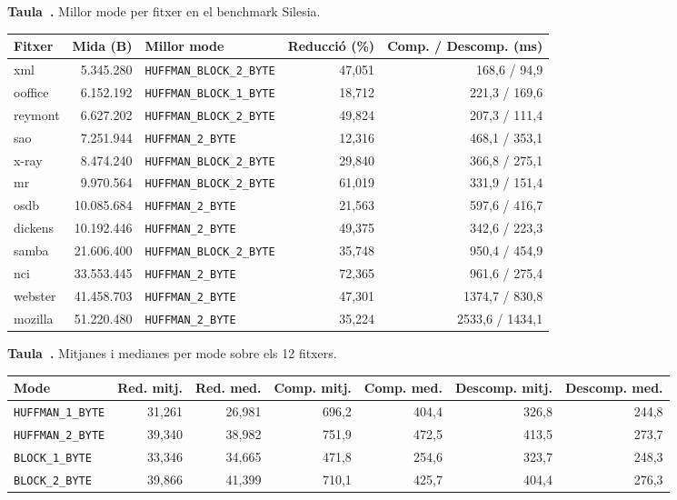 \documentclass[conference,compsoc]{IEEEtran}
\begin{document}
\begin{figure}[p]
\centering
\footnotesize

\label{tab:bestmode}
\textbf{Taula~\thetable.} Millor mode per fitxer en el benchmark Silesia.\par\smallskip
\scriptsize
\begin{tabular}{@{}lrlrr@{}}
\toprule
\textbf{Fitxer} & \textbf{Mida (B)} & \textbf{Millor mode} & \textbf{Reducció (\%)} & \textbf{Comp. / Descomp. (ms)} \\
\midrule
xml & 5.345.280 & \texttt{HUFFMAN\_BLOCK\_2\_BYTE} & 47,051 & 168,6 / 94,9 \\
ooffice & 6.152.192 & \texttt{HUFFMAN\_BLOCK\_1\_BYTE} & 18,712 & 221,3 / 169,6 \\
reymont & 6.627.202 & \texttt{HUFFMAN\_BLOCK\_2\_BYTE} & 49,824 & 207,3 / 111,4 \\
sao & 7.251.944 & \texttt{HUFFMAN\_2\_BYTE} & 12,316 & 468,1 / 353,1 \\
x-ray & 8.474.240 & \texttt{HUFFMAN\_BLOCK\_2\_BYTE} & 29,840 & 366,8 / 275,1 \\
mr & 9.970.564 & \texttt{HUFFMAN\_BLOCK\_2\_BYTE} & 61,019 & 331,9 / 151,4 \\
osdb & 10.085.684 & \texttt{HUFFMAN\_2\_BYTE} & 21,563 & 597,6 / 416,7 \\
dickens & 10.192.446 & \texttt{HUFFMAN\_2\_BYTE} & 49,375 & 342,6 / 223,3 \\
samba & 21.606.400 & \texttt{HUFFMAN\_BLOCK\_2\_BYTE} & 35,748 & 950,4 / 454,9 \\
nci & 33.553.445 & \texttt{HUFFMAN\_2\_BYTE} & 72,365 & 961,6 / 275,4 \\
webster & 41.458.703 & \texttt{HUFFMAN\_2\_BYTE} & 47,301 & 1374,7 / 830,8 \\
mozilla & 51.220.480 & \texttt{HUFFMAN\_2\_BYTE} & 35,224 & 2533,6 / 1434,1 \\
\bottomrule
\end{tabular}
\par\medskip

\label{tab:modeavg}
\textbf{Taula~\thetable.} Mitjanes i medianes per mode sobre els 12 fitxers.\par\smallskip
\scriptsize
\begin{tabular}{@{}lrrrrrr@{}}
\toprule
\textbf{Mode} & \textbf{Red. mitj.} & \textbf{Red. med.} & \textbf{Comp. mitj.} & \textbf{Comp. med.} & \textbf{Descomp. mitj.} & \textbf{Descomp. med.} \\
\midrule
\texttt{HUFFMAN\_1\_BYTE} & 31,261 & 26,981 & 696,2 & 404,4 & 326,8 & 244,8 \\
\texttt{HUFFMAN\_2\_BYTE} & 39,340 & 38,982 & 751,9 & 472,5 & 413,5 & 273,7 \\
\texttt{BLOCK\_1\_BYTE} & 33,346 & 34,665 & 471,8 & 254,6 & 323,7 & 248,3 \\
\texttt{BLOCK\_2\_BYTE} & 39,866 & 41,399 & 710,1 & 425,7 & 404,4 & 276,3 \\
\bottomrule
\end{tabular}
\par\medskip


\end{figure}
\end{document}
